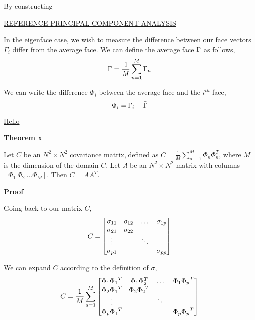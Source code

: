 \documentclass[12pt]{extarticle}
\begin{document}
        By constructing 
        
        \href{https://builtin.com/data-science/step-step-explanation-principal-component-analysis}{REFERENCE PRINCIPAL COMPONENT ANALYSIS}
        
        In the eigenface case, we wish to measure the difference between our face vectors $\Gamma_i$ differ from the average face. We can define the average face $\bar{\Gamma}$ as follows,
            \[
                \bar{\Gamma} = \frac{1}{M} \sum_{n=1}^M \Gamma_n
            \]

        We can write the difference $\Phi_i$ between the average face and the $i^{th}$ face,
            \[
                \Phi_i = \Gamma_i - \bar{\Gamma}
            \]
        
        \href{https://nzmaths.co.nz/category/glossary/variance-discrete-random-variable\#:\textasciitilde:text=A\%20measure\%20of\%20spread\%20for,2\%20or\%20\%CF\%832x.}{Hello}
        
        \textbf{Theorem x} 
        
        Let $C$ be an $N^2 \times N^2$ covariance matrix, defined as $C = \frac{1}{M} \sum_{n=1}^M \Phi_n \Phi_n^T$, where $M$ is the dimension of the domain $C$. Let $A$ be an $N^2 \times N^2$ matrix with columns $[\Phi_1 \ \Phi_2 \ \dots \Phi_M]$. Then $C = A A^T$.
        
        \textbf{Proof} 
        
        Going back to our matrix $C$,
            \[
                C = \begin{bmatrix}
                    \sigma_{11} & \sigma_{12} & \dots  & \sigma_{1p} \\
                    \sigma_{21} & \sigma_{22} &        &             \\
                    \vdots      &             & \ddots &             \\
                    \sigma_{p1} &             &        & \sigma_{pp}
                \end{bmatrix}
            \]

         We can expand $C$ according to the definition of $\sigma$,
            \[
                C = \frac{1}{M} \sum_{a=1}^M \begin{bmatrix}
                    \Phi_1 {\Phi_1}^T & \Phi_1 \Phi_2^T   & \dots  & \Phi_1 {\Phi_p}^T \\
                    \Phi_2 {\Phi_1}^T & \Phi_2 {\Phi_2}^T &        &                   \\
                    \vdots            &                   & \ddots &                   \\
                    \Phi_p {\Phi_1}^T &                   &        & \Phi_p {\Phi_p}^T
                \end{bmatrix}
            \]
    
\end{document}
